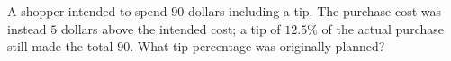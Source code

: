 A shopper intended to spend $90$ dollars including a tip. The purchase cost was instead $5$ dollars above the intended cost; a tip of $12.5\%$ of the actual purchase still made the total $90$. What tip percentage was originally planned?
